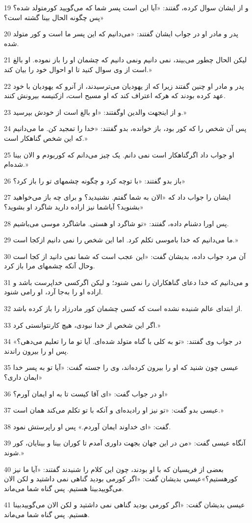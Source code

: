 \par 19 و از ایشان سوال کرده، گفتند: «آیا این است پسر شما که می‌گویید کورمتولد شده؟ پس چگونه الحال بینا گشته است؟»
\par 20 پدر و مادر او در جواب ایشان گفتند: «می‌دانیم که این پسر ما است و کور متولد شده.
\par 21 لیکن الحال چطور می‌بیند، نمی دانیم ونمی دانیم که چشمان او را باز نموده. او بالغ است از وی سوال کنید تا او احوال خود را بیان کند.»
\par 22 پدر و مادر او چنین گفتند زیرا که از یهودیان می‌ترسیدند، از آنرو که یهودیان با خود عهد کرده بودند که هر‌که اعتراف کند که او مسیح است، ازکنیسه بیرونش کنند.
\par 23 و از اینجهت والدین اوگفتند: «او بالغ است از خودش بپرسید.»
\par 24 پس آن شخص را که کور بود، باز خوانده، بدو گفتند: «خدا را تمجید کن. ما می‌دانیم که این شخص گناهکار است.»
\par 25 او جواب داد اگرگناهکار است نمی دانم. یک چیز می‌دانم که کوربودم و الان بینا شده‌ام.»
\par 26 باز بدو گفتند: «با توچه کرد و چگونه چشمهای تو را باز کرد؟»
\par 27 ایشان را جواب داد که «الان به شما گفتم. نشنیدید؟ و برای چه باز می‌خواهید بشنوید؟ آیاشما نیز اراده دارید شاگرد او بشوید؟»
\par 28 پس اورا دشنام داده، گفتند: «تو شاگرد او هستی. ماشاگرد موسی می‌باشیم.
\par 29 ما می‌دانیم که خدا باموسی تکلم کرد. اما این شخص را نمی دانیم ازکجا است.»
\par 30 آن مرد جواب داده، بدیشان گفت: «این عجب است که شما نمی دانید از کجا است وحال آنکه چشمهای مرا باز کرد.
\par 31 و می‌دانیم که خدا دعای گناهکاران را نمی شنود؛ و لیکن اگرکسی خداپرست باشد و اراده او را به‌جا آرد، او رامی شنود.
\par 32 از ابتدای عالم شنیده نشده است که کسی چشمان کور مادرزاد را باز کرده باشد.
\par 33 اگر این شخص از خدا نبودی، هیچ کارنتوانستی کرد.»
\par 34 در جواب وی گفتند: «تو به کلی با گناه متولد شده‌ای. آیا تو ما را تعلیم می‌دهی؟» پس او را بیرون راندند.
\par 35 عیسی چون شنید که او را بیرون کرده‌اند، وی را جسته گفت: «آیا تو به پسر خدا ایمان داری؟»
\par 36 او در جواب گفت: «ای آقا کیست تا به او ایمان آورم؟»
\par 37 عیسی بدو گفت: «تو نیز او رادیده‌ای و آنکه با تو تکلم می‌کند همان است.»
\par 38 گفت: «ای خداوند ایمان آوردم.» پس او راپرستش نمود.
\par 39 آنگاه عیسی گفت: «من در این جهان بجهت داوری آمدم تا کوران بینا و بینایان، کور شوند.»
\par 40 بعضی از فریسیان که با او بودند، چون این کلام را شنیدند گفتند: «آیا ما نیز کورهستیم؟»عیسی بدیشان گفت: «اگر کورمی بودید گناهی نمی داشتید و لکن الان می‌گوییدبینا هستیم. پس گناه شما می‌ماند.
\par 41 عیسی بدیشان گفت: «اگر کورمی بودید گناهی نمی داشتید و لکن الان می‌گوییدبینا هستیم. پس گناه شما می‌ماند.

